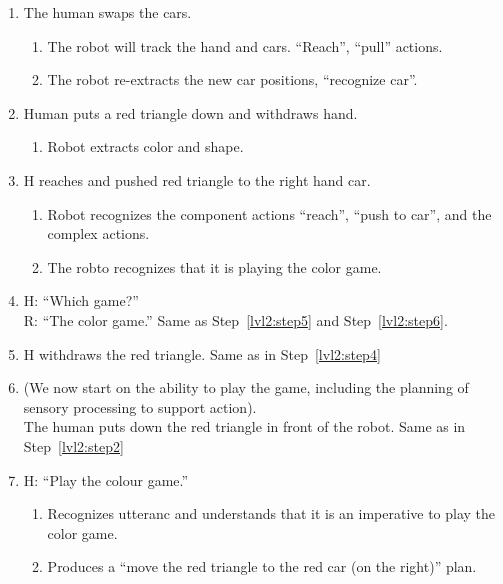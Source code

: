 \documentclass{article}
\begin{document}
\begin{enumerate}
\item \label{lvl2:step12}
  The human swaps the cars.
  \begin{enumerate}
  \item \label{lvl2:step12:detail1} The robot will track the hand and
    cars. ``Reach'', ``pull'' actions.
  \item \label{lvl2:step12:details2} The robot re-extracts the new
    car positions, ``recognize car''.
  \end{enumerate}

\item \label{lvl2:step13}
  Human puts a red triangle down and withdraws hand.
  \begin{enumerate}
  \item \label{lvl2:step13:detail1} Robot extracts color and shape.
  \end{enumerate}
  
\item \label{lvl2:step14}
  H reaches and pushed red triangle to the right hand car.
  \begin{enumerate}
  \item \label{lvl2:step14:detail1} Robot recognizes the component
    actions ``reach'', ``push to car'', and the complex actions.
  \item \label{lvl2:step14:detail2} The robto recognizes that it is
    playing the color game.
  \end{enumerate}

\item \label{lvl2:step15}
  H: ``Which game?''\\
  R: ``The color game.''
  Same as Step~\ref{lvl2:step5} and Step~\ref{lvl2:step6}.

\item \label{lvl2:step16}
  H withdraws the red triangle.
  Same as in Step~\ref{lvl2:step4}

\item \label{lvl2:step17} (We now start on the ability to play the
  game, including the planning of sensory processing to support
  action).\\
  The human puts down the red triangle in front of the robot.
  Same as in Step~\ref{lvl2:step2}

\item \label{lvl2:step18}  
  H: ``Play the colour game.''
  \begin{enumerate}
  \item \label{lvl2:step18:detail1} Recognizes utteranc and
    understands that it is an imperative to play the color game.
  \item \label{lvl2:step18:detail2} Produces a ``move the red triangle
    to the red car (on the right)'' plan.
  \end{enumerate}
  

\end{enumerate}
\end{document}
